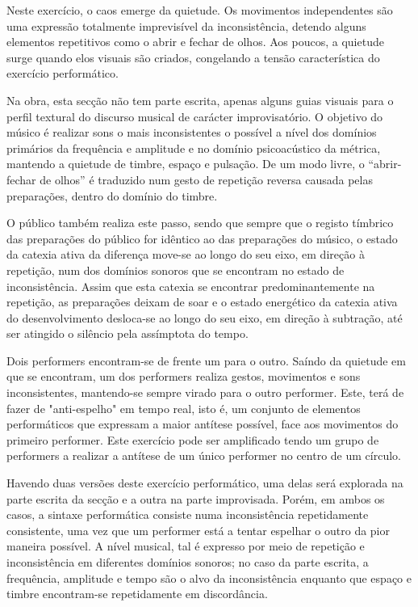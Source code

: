 \documentclass[../main.tex]{subfiles}
\begin{document}
Neste exercício, o caos emerge da quietude. Os movimentos independentes são uma expressão totalmente imprevisível da inconsistência, detendo alguns elementos repetitivos como o abrir e fechar de olhos. Aos poucos, a quietude surge quando elos visuais são criados, congelando a tensão característica do exercício performático.

Na obra, esta secção não tem parte escrita, apenas alguns guias visuais para o perfil textural do discurso musical de carácter improvisatório. O objetivo do músico é realizar sons o mais inconsistentes o possível a nível dos domínios primários da frequência e amplitude e no domínio psicoacústico da métrica, mantendo a quietude de timbre, espaço e pulsação. De um modo livre, o \enquote{abrir-fechar de olhos} é traduzido num gesto de repetição reversa causada pelas preparações, dentro do domínio do timbre.

O público também realiza este passo, sendo que sempre que o registo tímbrico das preparações do público for idêntico ao das preparações do músico, o estado da catexia ativa da diferença move-se ao longo do seu eixo, em direção à repetição, num dos domínios sonoros que se encontram no estado de inconsistência. Assim que esta catexia se encontrar predominantemente na repetição, as preparações deixam de soar e o estado energético da catexia ativa do desenvolvimento desloca-se ao longo do seu eixo, em direção à subtração, até ser atingido o silêncio pela assímptota do tempo.

\begin{performex}
    Dois performers encontram-se de frente um para o outro. Saíndo da quietude em que se encontram, um dos performers realiza gestos, movimentos e sons inconsistentes, mantendo-se sempre virado para o outro performer. Este, terá de fazer de "anti-espelho" em tempo real, isto é, um conjunto de elementos performáticos que expressam a maior antítese possível, face aos movimentos do primeiro performer. Este exercício pode ser amplificado tendo um grupo de performers a realizar a antítese de um único performer no centro de um círculo.
\end{performex}

Havendo duas versões deste exercício performático, uma delas será explorada na parte escrita da secção e a outra na parte improvisada. Porém, em ambos os casos, a sintaxe performática consiste numa inconsistência repetidamente consistente, uma vez que um performer está a tentar espelhar o outro da pior maneira possível. A nível musical, tal é expresso por meio de repetição e inconsistência em diferentes domínios sonoros; no caso da parte escrita, a frequência, amplitude e tempo são o alvo da inconsistência enquanto que espaço e timbre encontram-se repetidamente em discordância.
\end{document}

